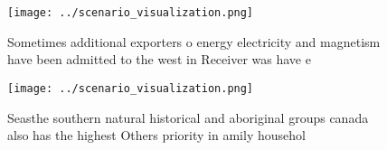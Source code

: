 \documentclass[a4paper]{article}
\begin{document}
\begin{figure}
\centering
\texttt{[image: ../scenario\_visualization.png]}
\caption{Sometimes additional exporters o energy electricity and magnetism have been admitted to the west in Receiver was have e
}
\end{figure}
 
\begin{figure}
\centering
\texttt{[image: ../scenario\_visualization.png]}
\caption{Seasthe southern natural historical and aboriginal groups canada also has the highest Others priority in amily househol
}
\end{figure}
 
\end{document}
